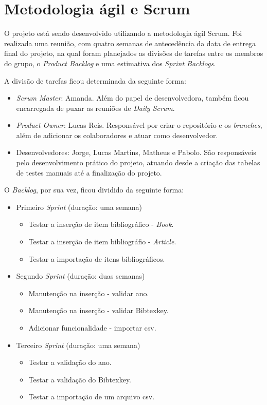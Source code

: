 \section{Metodologia ágil e Scrum}
O projeto está sendo desenvolvido utilizando a metodologia ágil Scrum. Foi realizada uma reunião, com quatro semanas de antecedência da data de entrega final do projeto, na qual foram planejados as divisões de tarefas entre os membros do grupo, o \textit{Product Backlog} e uma estimativa dos \textit{Sprint Backlogs}.
\newline
\par A divisão de tarefas ficou determinada da seguinte forma:
\begin{itemize}
    \item \textit{Scrum Master}: Amanda. Além do papel de desenvolvedora, também ficou encarregada de puxar as reuniões de \textit{Daily Scrum}.
    \item \textit{Product Owner}: Lucas Reis. Responsável por criar o repositório e os \textit{branches}, além de adicionar os colaboradores e atuar como desenvolvedor.
    \item Desenvolvedores: Jorge, Lucas Martins, Matheus e Pabolo. São responsáveis pelo desenvolvimento prático do projeto, atuando desde a criação das tabelas de testes manuais até a finalização do projeto.
\end{itemize}

O \textit{Backlog}, por sua vez, ficou dividido da seguinte forma:
\begin{itemize}
    \item Primeiro \textit{Sprint} (duração: uma semana)
        \begin{itemize}
            \item Testar a inserção de item bibliográfico - \textit{Book}.
            \item Testar a inserção de item bibliográfio - \textit{Article}.
            \item Testar a importação de itens bibliográficos.
        \end{itemize}
    \item Segundo \textit{Sprint} (duração: duas semanas)
        \begin{itemize}
            \item Manutenção na inserção - validar ano.
            \item Manutenção na inserção - validar Bibtexkey.
            \item Adicionar funcionalidade - importar csv.
        \end{itemize}
    \item Terceiro \textit{Sprint} (duração: uma semana)
        \begin{itemize}
            \item Testar a validação do ano.
            \item Testar a validação do Bibtexkey.
            \item Testar a importação de um arquivo csv.
        \end{itemize}
\end{itemize}

